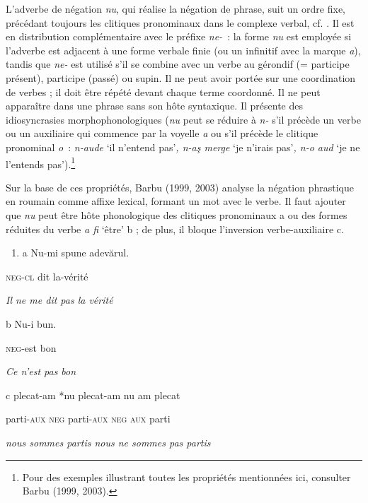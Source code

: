 L'adverbe de négation \textit{nu}, qui réalise la négation de phrase, suit un ordre fixe, précédant toujours les clitiques pronominaux dans le complexe verbal, cf. . Il est en distribution complémentaire avec le préfixe \textit{ne-~}: la forme \textit{nu} est employée si l'adverbe est adjacent à une forme verbale finie (ou un infinitif avec la marque \textit{a}), tandis que \textit{ne-} est utilisé s'il se combine avec un verbe au gérondif (= participe présent), participe (passé) ou supin. Il ne peut avoir portée sur une coordination de verbes ; il doit être répété devant chaque terme coordonné. Il ne peut apparaître dans une phrase sans son hôte syntaxique. Il présente des idiosyncrasies morphophonologiques (\textit{nu} peut se réduire à \textit{n-} s'il précède un verbe ou un auxiliaire qui commence par la voyelle \textit{a} ou s'il précède le clitique pronominal \textit{o~}: \textit{n-aude} `il n'entend pas'\textit{, n-aş merge} `je n'irais pas'\textit{, n-o aud} `je ne l'entends pas').\footnote{Pour des exemples illustrant toutes les propriétés mentionnées ici, consulter Barbu (1999, 2003).}  

Sur la base de ces propriétés, Barbu (1999, 2003) analyse la négation phrastique en roumain comme affixe lexical, formant un mot avec le verbe. Il faut ajouter que \textit{nu} peut être hôte phonologique des clitiques pronominaux a ou des formes réduites du verbe \textit{a fi} `être' b ; de plus, il bloque l'inversion verbe-auxiliaire c.


\begin{enumerate}
\item \label{bkm:Ref299296824}a  Nu-mi  spune adevărul. 


\end{enumerate}
\textsc{neg-cl} dit  la-vérité 

{\itshape
Il ne me dit pas la vérité}

b  Nu-i bun.

  \textsc{neg-}est bon

  \textit{Ce n'est pas bon} 

c  plecat-am {\textbar} *nu  plecat-am {\textbar} nu  am  plecat

  parti-\textsc{aux} {\textbar}  \textsc{neg} parti-\textsc{aux} {\textbar} \textsc{neg} \textsc{aux} parti

{\itshape
  nous sommes partis {\textbar} nous ne sommes pas partis}

